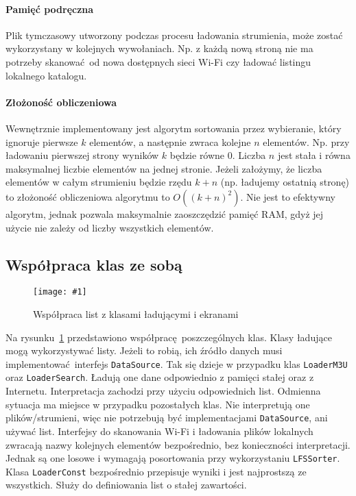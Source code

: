 \documentclass[polish]{aghengthesis}
\newcommand{\imgint}[4]{
	\begin{figure}[{#4}]
		\centering
		\texttt{[image: \#1]}
		\caption{#2}
		\label{#1}
	\end{figure}
}
\newcommand{\imgh}[3]{\imgint{#1}{#2}{#3}{H}}
\begin{document}
			\paragraph{Pamięć podręczna}
			Plik tymczasowy utworzony podczas procesu ładowania strumienia, może zostać wykorzystany w kolejnych wywołaniach. Np. z każdą nową stroną nie ma potrzeby skanować od nowa dostępnych sieci Wi-Fi czy ładować listingu lokalnego katalogu.
						
			\paragraph{Złożoność obliczeniowa}
			Wewnętrznie implementowany jest algorytm sortowania przez wybieranie, który ignoruje pierwsze $k$ elementów, a następnie zwraca kolejne $n$ elementów. Np. przy ładowaniu pierwszej strony wyników $k$ będzie równe 0. Liczba $n$ jest stała i równa maksymalnej liczbie elementów na jednej stronie. Jeżeli założymy, że liczba elementów w całym strumieniu będzie rzędu $k+n$ (np. ładujemy ostatnią stronę) to złożoność obliczeniowa algorytmu to $O((k+n)^2)$. Nie jest to efektywny algorytm, jednak pozwala maksymalnie zaoszczędzić pamięć RAM, gdyż jej użycie nie zależy od liczby wszystkich elementów.
			

		\subsection{Współpraca klas ze sobą}
			\imgh{3/PicoRadio-loaders}{Współpraca list z klasami ładującymi i ekranami}{0.95}
			Na rysunku~\ref{3/PicoRadio-loaders} przedstawiono współpracę poszczególnych klas. Klasy ładujące mogą wykorzystywać listy. Jeżeli to robią, ich źródło danych musi implementować interfejs \lstinline|DataSource|. Tak się dzieje w przypadku klas \lstinline|LoaderM3U| oraz \lstinline|LoaderSearch|. Ładują one dane odpowiednio z pamięci stałej oraz z Internetu. Interpretacja zachodzi przy użyciu odpowiednich list. Odmienna sytuacja ma miejsce w przypadku pozostałych klas. Nie interpretują one plików/strumieni, więc nie potrzebują być implementacjami \lstinline|DataSource|, ani używać list. Interfejsy do skanowania Wi-Fi i ładowania plików lokalnych zwracają nazwy kolejnych elementów bezpośrednio, bez konieczności interpretacji. Jednak są one losowe i wymagają posortowania przy wykorzystaniu \lstinline|LFSSorter|. Klasa \lstinline|LoaderConst| bezpośrednio przepisuje wyniki i jest najprostszą ze wszystkich. Służy do definiowania list o stałej zawartości.
			
\end{document}
